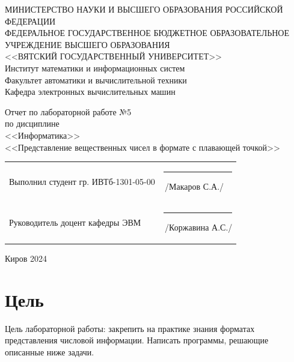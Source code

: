 \documentclass[a4paper,14pt]{extarticle}
\begin{document}
  \newpage\thispagestyle{empty}
  \begin{center}
    \MakeUppercase{
      Министерство науки и высшего образования Российской Федерации\\
      Федеральное государственное бюджетное образовательное учреждение высшего образования\\
      <<Вятский Государственный Университет>>\\
    }
    Институт математики и информационных систем\\
    Факультет автоматики и вычислительной техники\\
    Кафедра электронных вычислительных машин
  \end{center}
  \vfill

  \begin{center}
    Отчет по лабораторной работе №5\\
    по дисциплине\\
    <<Информатика>>\\
    <<Представление вещественных чисел в формате с плавающей точкой>>
  \end{center}
  \vfill

  \noindent
  \begin{tabular}{ll}
    Выполнил студент гр. ИВТб-1301-05-00 \hspace{5mm} &
    \rule[-1mm]{25mm}{0.10mm}\,/Макаров С.А./\\
    
    Руководитель доцент кафедры ЭВМ & \rule[-1mm]{25mm}{0.10mm}\,/Коржавина А.С./\\
  \end{tabular}

  \vfill
  \begin{center}
    Киров 2024
  \end{center}

  \newpage
  \section*{Цель}
  Цель лабораторной работы: закрепить на практике знания форматах представления числовой информации. Написать программы, решающие описанные ниже задачи.
\end{document}
